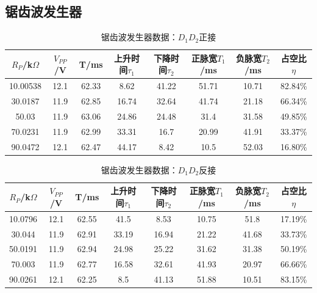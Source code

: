 \documentclass[a4paper]{article}
\begin{document}
\subsection{锯齿波发生器}%
\begin{table}[!h]
\centering
\caption{锯齿波发生器数据：$D_1D_2$正接}
\label{data4:1}
\begin{tabular}{|c|c|c|c|c|c|c|c|}
\hline
$R_P$/k$\Omega$ & $V_{PP}$/V & T/ms  & 上升时间$\tau_1$ & 下降时间$\tau_2$ & 正脉宽$T_1$/ms & 负脉宽$T_2$/ms & 占空比$\eta$ \\ \hline
10.00538        & 12.1       & 62.33 & 8.62         & 41.22        & 51.71       & 10.71       & 82.84\%   \\ \hline
30.0187         & 11.9       & 62.85 & 16.74        & 32.64        & 41.74       & 21.18       & 66.34\%   \\ \hline
50.03           & 11.9       & 63.06 & 24.86        & 24.48        & 31.4        & 31.58       & 49.85\%   \\ \hline
70.0231         & 11.9       & 62.99 & 33.31        & 16.7         & 20.99       & 41.91       & 33.37\%   \\ \hline
90.0472         & 12.1       & 62.47 & 44.17        & 8.42         & 10.5        & 52.03       & 16.80\%   \\ \hline
\end{tabular}
\end{table}
\begin{table}[!h]
\centering
\caption{锯齿波发生器数据：$D_1D_2$反接}
\label{data4:2}
\begin{tabular}{|c|c|c|c|c|c|c|c|}
\hline
$R_P$/k$\Omega$ & $V_{PP}$/V & T/ms  & 上升时间$\tau_1$ & 下降时间$\tau_2$ & 正脉宽$T_1$/ms & 负脉宽$T_2$/ms & 占空比$\eta$ \\ \hline
10.0796         & 12.1       & 62.55 & 41.5         & 8.53         & 10.75       & 51.8        & 17.19\%   \\ \hline
30.044          & 11.9       & 62.91 & 33.19        & 16.94        & 21.22       & 41.68       & 33.73\%   \\ \hline
50.0191         & 11.9       & 62.94 & 24.98        & 25.22        & 31.62       & 31.38       & 50.19\%   \\ \hline
70.003          & 11.9       & 62.77 & 16.58        & 32.61        & 41.93       & 20.97       & 66.66\%   \\ \hline
90.0261         & 12.1       & 62.25 & 8.5          & 41.13        & 51.88       & 10.51       & 83.15\%   \\ \hline
\end{tabular}
\end{table}
\end{document}
